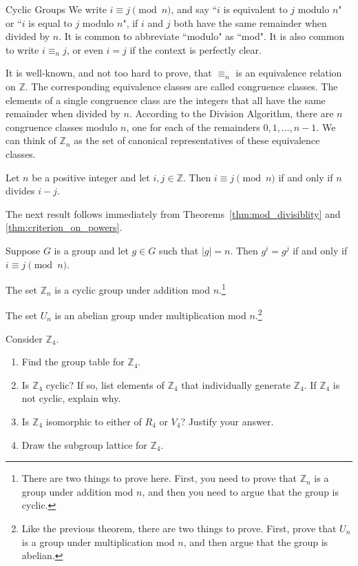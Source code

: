 \begin{section}{Cyclic Groups}
We write $i\equiv j\pmod n$, and say ``$i$ is equivalent to $j$ modulo $n$" or ``$i$ is equal to $j$ modulo $n$", if $i$ and $j$ both have the same remainder when divided by $n$.  It is common to abbreviate ``modulo" as ``mod".  It is also common to write $i\equiv_n j$, or even $i=j$ if the context is perfectly clear.  

It is well-known, and not too hard to prove, that $\equiv_n$ is an equivalence relation on $\mathbb{Z}$.  The corresponding equivalence classes are called congruence classes.  The elements of a single congruence class are the integers that all have the same remainder when divided by $n$. According to the Division Algorithm, there are $n$ congruence classes modulo $n$, one for each of the remainders $0,1,\ldots, n-1$. We can think of $\mathbb{Z}_n$ as the set of canonical representatives of these equivalence classes.

\begin{theorem}\label{thm:mod_divisiblity}
Let $n$ be a positive integer and let $i,j\in\mathbb{Z}$. Then $i\equiv j\pmod n$ if and only if $n$ divides $i-j$.
\end{theorem}

The next result follows immediately from Theorems~\ref{thm:mod_divisiblity} and \ref{thm:criterion_on_powers}.

\begin{corollary}
Suppose $G$ is a group and let $g\in G$ such that $|g|=n$.  Then $g^i=g^j$ if and only if $i\equiv j\pmod n$.
\end{corollary}

\begin{theorem}
The set $\mathbb{Z}_n$ is a cyclic group under addition mod $n$.\footnote{There are two things to prove here.  First, you need to prove that $\mathbb{Z}_n$ is a group under addition mod $n$, and then you need to argue that the group is cyclic.}
\end{theorem}

\begin{theorem}
The set $U_n$ is an abelian group under multiplication mod $n$.\footnote{Like the previous theorem, there are two things to prove. First, prove that $U_n$ is a group under multiplication mod $n$, and then argue that the group is abelian.}
\end{theorem}

\begin{problem}
Consider $\mathbb{Z}_4$.
\begin{enumerate}[label=\textrm{(\alph*)}]
\item Find the group table for $\mathbb{Z}_4$.
\item Is $\mathbb{Z}_4$ cyclic? If so, list elements of $\mathbb{Z}_4$ that individually generate $\mathbb{Z}_4$.  If $\mathbb{Z}_4$ is not cyclic, explain why.
\item Is $\mathbb{Z}_4$ isomorphic to either of $R_4$ or $V_4$? Justify your answer.
\item Draw the subgroup lattice for $\mathbb{Z}_4$.
\end{enumerate}
\end{problem}


\end{section}
